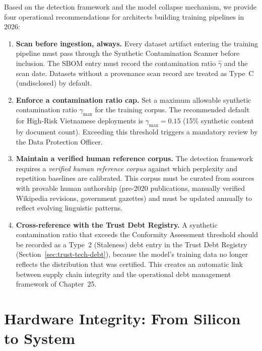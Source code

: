 Based on the detection framework and the model collapse
mechanism, we provide four operational recommendations for
architects building training pipelines in 2026:

\begin{enumerate}
  \item \textbf{Scan before ingestion, always.}
    Every dataset artifact entering the training pipeline
    must pass through the Synthetic Contamination Scanner
    before inclusion.
    The SBOM entry must record the contamination ratio
    $\hat{\gamma}$ and the scan date.
    Datasets without a provenance scan record are treated
    as Type~C (undisclosed) by default.

  \item \textbf{Enforce a contamination ratio cap.}
    Set a maximum allowable synthetic contamination ratio
    $\gamma_{\max}$ for the training corpus.
    The recommended default for High-Risk Vietnamese
    deployments is $\gamma_{\max} = 0.15$ (15\% synthetic
    content by document count).
    Exceeding this threshold triggers a mandatory review
    by the Data Protection Officer.

  \item \textbf{Maintain a verified human reference corpus.}
    The detection framework requires a
    \emph{verified human reference corpus} against which
    perplexity and repetition baselines are calibrated.
    This corpus must be curated from sources with provable
    human authorship (pre-2020 publications, manually
    verified Wikipedia revisions, government gazettes)
    and must be updated annually to reflect evolving
    linguistic patterns.

  \item \textbf{Cross-reference with the Trust Debt Registry.}
    A synthetic contamination ratio that exceeds the
    Conformity Assessment threshold should be recorded as a
    Type~2 (Staleness) debt entry in the Trust Debt
    Registry (Section~\ref{sec:trust-tech-debt}), because
    the model's training data no longer reflects the
    distribution that was certified.
    This creates an automatic link between supply chain
    integrity and the operational debt management framework
    of Chapter~25.
\end{enumerate}

\section{Hardware Integrity: From Silicon to System}
\label{sec:hardware_integrity}

